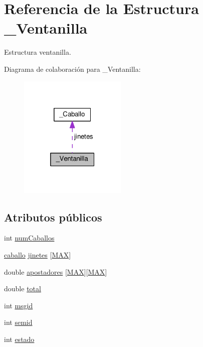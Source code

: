 \hypertarget{struct__Ventanilla}{}\section{Referencia de la Estructura \+\_\+\+Ventanilla}
\label{struct__Ventanilla}


Estructura ventanilla.  




Diagrama de colaboración para \+\_\+\+Ventanilla\+:\nopagebreak
\begin{figure}[H]
\begin{center}
\leavevmode
\includegraphics[width=145pt]{struct__Ventanilla__coll__graph}
\end{center}
\end{figure}
\subsection*{Atributos públicos}
\begin{DoxyCompactItemize}
\item 
int \hyperlink{struct__Ventanilla_a9d1361c0811ea37ac86765ed0ad50a8f}{num\+Caballos}
\item 
\hyperlink{carrera_8c_a9700d9b08f47d213e0daf7317219022e}{caballo} \hyperlink{struct__Ventanilla_ab359f2cc43a4adf0b65ccf8ffd5cd145}{jinetes} \mbox{[}\hyperlink{carrera_8c_a392fb874e547e582e9c66a08a1f23326}{M\+AX}\mbox{]}
\item 
double \hyperlink{struct__Ventanilla_a19ef890de873fe54c27d1726fb9ca947}{apostadores} \mbox{[}\hyperlink{carrera_8c_a392fb874e547e582e9c66a08a1f23326}{M\+AX}\mbox{]}\mbox{[}\hyperlink{carrera_8c_a392fb874e547e582e9c66a08a1f23326}{M\+AX}\mbox{]}
\item 
double \hyperlink{struct__Ventanilla_a1b4846eb8da9d38419a3f918fe9665c1}{total}
\item 
int \hyperlink{struct__Ventanilla_a66a8337f17a857c1ad379db598bba1c9}{msgid}
\item 
int \hyperlink{struct__Ventanilla_a2834f69015926e1879286fe9af2a72b3}{semid}
\item 
int \hyperlink{struct__Ventanilla_a6b5316b20a1be71403695aeac94346e5}{estado}
\end{DoxyCompactItemize}


